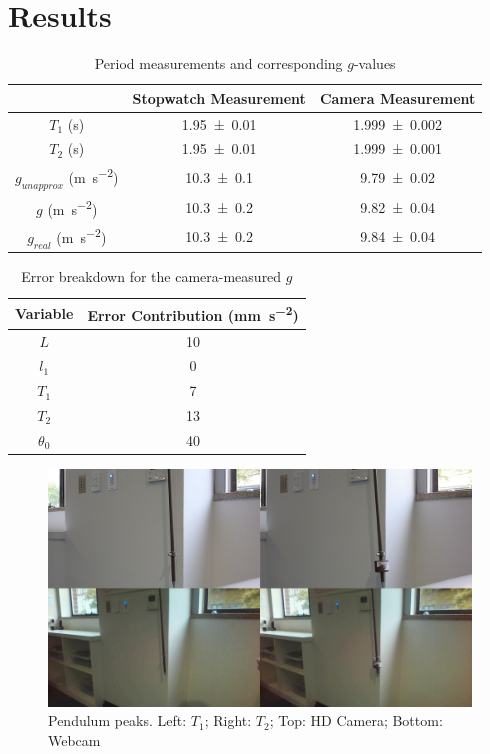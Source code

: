 \documentclass[a4paper]{scrartcl}
\begin{document}
\section{Results}
\begin{table}[d]
    \centering
    \begin{tabular}{c | c | c}
        & Stopwatch Measurement & Camera Measurement \\
        \hline
        \(T_1\) (\si{\second}) & \SI{1.95 \pm 0.01}{} & \SI{1.999 \pm 0.002}{} \\
        \(T_2\) (\si{\second}) & \SI{1.95 \pm 0.01}{} & \SI{1.999 \pm 0.001}{} \\
        \hline
        \(g_{unapprox}\) (\si{\metre\per\second\squared}) & \SI{10.3 \pm 0.1}{} & \SI{9.79 \pm 0.02}{} \\
        \(g\) (\si{\metre\per\second\squared}) & \SI{10.3 \pm 0.2}{} & \SI{9.82 \pm 0.04}{} \\
        \(g_{real}\) (\si{\metre\per\second\squared}) & \SI{10.3 \pm 0.2}{} & \SI{9.84 \pm 0.04}{}
    \end{tabular}
    \caption{Period measurements and corresponding \(g\)-values}
    \label{tab:periods}
\end{table}

\begin{table}[d]
    \centering
    \begin{tabular}{c | c}
        Variable & Error Contribution (\si{\milli\metre\per\second\squared}) \\
        \hline
        \(L\) & \SI{10}{} \\
        \(l_1\) & \SI{0}{} \\
        \(T_1\) & \SI{7}{} \\
        \(T_2\) & \SI{13}{} \\
        \(\theta_0\) & \SI{40}{}
    \end{tabular}
    \caption{Error breakdown for the camera-measured \(g\)}
    \label{tab:errors}
\end{table}

\begin{figure}[d]
    \centering
    \includegraphics[width = 18cm]{video.jpg}
    \caption{Pendulum peaks. Left: \(T_1\); Right: \(T_2\); Top: HD Camera; Bottom: Webcam}
    \label{fig:video}
\end{figure}
\end{document}
